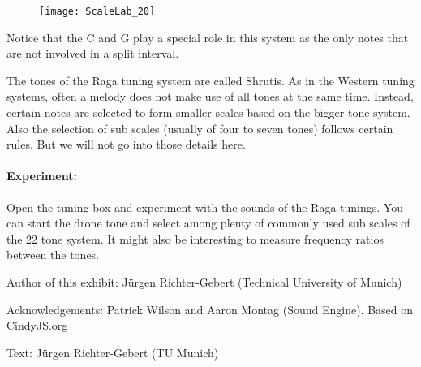 \begin{figure}[h]
\centering
\texttt{[image: ScaleLab\_20]}
\end{figure}

Notice that the C and G play a special role in this system as the only notes that are not involved in a split interval.

The tones of the Raga tuning system are called Shrutis. As in the Western tuning systems, often a melody does not make use of all tones at the same time. Instead, certain notes are selected to form smaller scales based on the bigger tone system. Also the selection of sub scales (usually of four to seven tones) follows certain rules. But we will not go into those details here.

\paragraph{Experiment:} Open the tuning box and experiment with the sounds of the Raga tunings. You can start the drone tone and select among plenty of commonly used sub scales of the 22 tone system. It might also be interesting to measure frequency ratios between the tones.

\begin{sectcredits}
\item[Author of this exhibit:] Jürgen Richter-Gebert (Technical University of Munich)
\item[Acknowledgements:] Patrick Wilson and Aaron Montag (Sound Engine). Based on CindyJS.org
\item[Text:] Jürgen Richter-Gebert (TU Munich)
\end{sectcredits}
